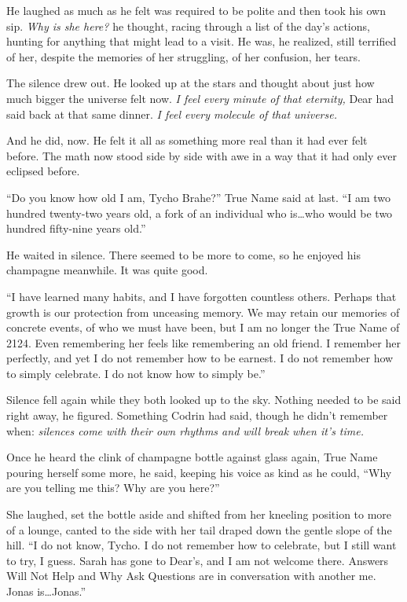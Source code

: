 He laughed as much as he felt was required to be polite and then took his own sip. \emph{Why is she here?} he thought, racing through a list of the day's actions, hunting for anything that might lead to a visit. He was, he realized, still terrified of her, despite the memories of her struggling, of her confusion, her tears.

The silence drew out. He looked up at the stars and thought about just how much bigger the universe felt now. \emph{I feel every minute of that eternity,} Dear had said back at that same dinner. \emph{I feel every molecule of that universe.}

And he did, now. He felt it all as something more real than it had ever felt before. The math now stood side by side with awe in a way that it had only ever eclipsed before.

``Do you know how old I am, Tycho Brahe?'' True Name said at last. ``I am two hundred twenty-two years old, a fork of an individual who is\ldots who would be two hundred fifty-nine years old.''

He waited in silence. There seemed to be more to come, so he enjoyed his champagne meanwhile. It was quite good.

``I have learned many habits, and I have forgotten countless others. Perhaps that growth is our protection from unceasing memory. We may retain our memories of concrete events, of who we must have been, but I am no longer the True Name of 2124. Even remembering her feels like remembering an old friend. I remember her perfectly, and yet I do not remember how to be earnest. I do not remember how to simply celebrate. I do not know how to simply be.''

Silence fell again while they both looked up to the sky. Nothing needed to be said right away, he figured. Something Codrin had said, though he didn't remember when: \emph{silences come with their own rhythms and will break when it's time.}

Once he heard the clink of champagne bottle against glass again, True Name pouring herself some more, he said, keeping his voice as kind as he could, ``Why are you telling me this? Why are you here?''

She laughed, set the bottle aside and shifted from her kneeling position to more of a lounge, canted to the side with her tail draped down the gentle slope of the hill. ``I do not know, Tycho. I do not remember how to celebrate, but I still want to try, I guess. Sarah has gone to Dear's, and I am not welcome there. Answers Will Not Help and Why Ask Questions are in conversation with another me. Jonas is\ldots Jonas.''

